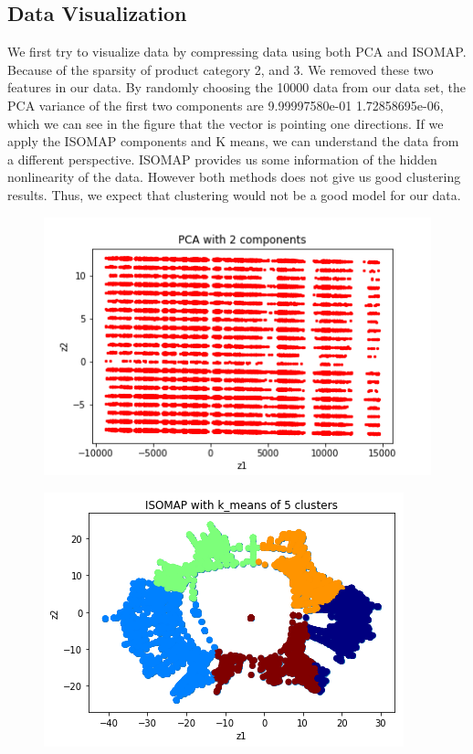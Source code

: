 \documentclass{article}
\begin{document}
\subsection{Data Visualization}
We first try to visualize data  by compressing data using both PCA and ISOMAP. Because of the sparsity of product category 2, and 3. We removed these two features in our data.
By randomly choosing the 10000 data from our data set, the PCA variance of the first two components are 9.99997580e-01 1.72858695e-06, which we can see in the figure that the vector is pointing one directions. If we apply the ISOMAP components and K means, we can understand the data from a different perspective. ISOMAP provides us some information of the hidden nonlinearity of the data. However both methods does not give us good clustering results. Thus,  we expect that clustering would not be a good model for our data.
\begin{figure}
\includegraphics[width=0.8\linewidth]{../figs/PCA_with_2_components.png}
\end{figure}
\begin{figure}
\includegraphics[width=0.8\linewidth]{../figs/ISOMAP_5 clusters.png}
\end{figure}
\end{document}
